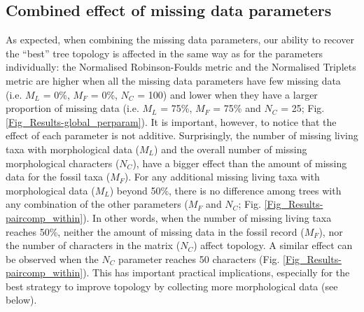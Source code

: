 \subsection{Combined effect of missing data parameters}
As expected, when combining the missing data parameters, our ability to recover the ``best'' tree topology is affected in the same way as for the parameters individually: the Normalised Robinson-Foulds metric and the Normalised Triplets metric are higher when all the missing data parameters have few missing data (i.e. $M_{L}$ = 0\%, $M_{F}$ = 0\%, $N_{C}$ = 100) and lower when they have a larger proportion of missing data (i.e. $M_{L}$ = 75\%, $M_{F}$ = 75\% and $N_{C}$ = 25; Fig. \ref{Fig_Results-global_perparam}).
It is important, however, to notice that the effect of each parameter is not additive.
Surprisingly, the number of missing living taxa with morphological data ($M_{L}$) and the overall number of missing morphological characters ($N_{C}$), have a bigger effect than the amount of missing data for the fossil taxa ($M_{F}$).
For any additional missing living taxa with morphological data ($M_L$) beyond 50\%, there is no difference among trees with any combination of the other parameters ($M_F$ and $N_C$; Fig. \ref{Fig_Results-paircomp_within}).
In other words, when the number of missing living taxa reaches 50\%, neither the amount of missing data in the fossil record ($M_F$), nor the number of characters in the matrix ($N_C$) affect topology.
A similar effect can be observed when the $N_C$ parameter reaches 50 characters (Fig. \ref{Fig_Results-paircomp_within}).
This has important practical implications, especially for the best strategy to improve topology by collecting more morphological data (see below).


